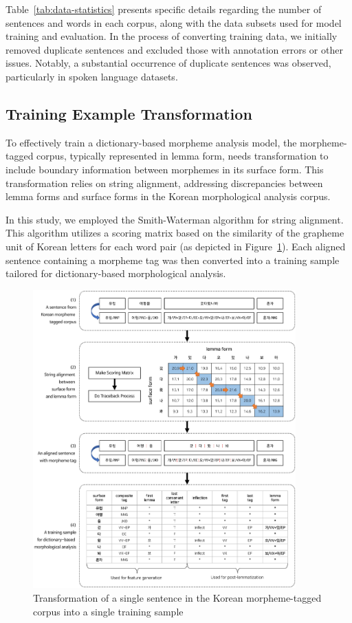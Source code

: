 \documentclass[AMS,STIX2COL]{WileyNJD-v2}
\begin{document}
    Table~\ref{tab:data-statistics} presents specific details regarding the number of sentences and words in each corpus, along with the data subsets used for model training and evaluation.
    In the process of converting training data, we initially removed duplicate sentences and excluded those with annotation errors or other issues.
    Notably, a substantial occurrence of duplicate sentences was observed, particularly in spoken language datasets.

    \subsection{Training Example Transformation}\label{subsec:training-example-transformation}

    To effectively train a dictionary-based morpheme analysis model, the morpheme-tagged corpus, typically represented in lemma form, needs transformation to include boundary information between morphemes in its surface form.
    This transformation relies on string alignment, addressing discrepancies between lemma forms and surface forms in the Korean morphological analysis corpus.

    In this study, we employed the Smith-Waterman algorithm for string alignment.
    This algorithm utilizes a scoring matrix based on the similarity of the grapheme unit of Korean letters for each word pair (as depicted in Figure~\ref{fig:sample}).
    Each aligned sentence containing a morpheme tag was then converted into a training sample tailored for dictionary-based morphological analysis.

    \begin{figure}[ht]
        \centerline{\includegraphics[width=0.9\textwidth]{fig;sample-v3}}
        \caption{Transformation of a single sentence in the Korean morpheme-tagged corpus into a single training sample}
        \label{fig:sample}
    \end{figure}
\end{document}
